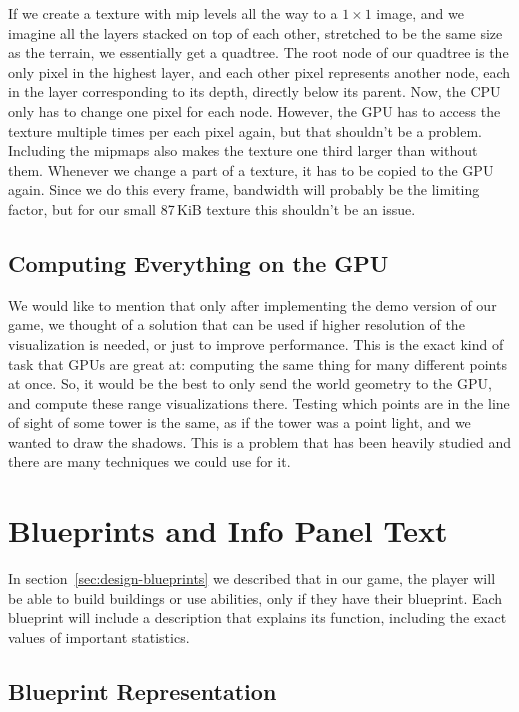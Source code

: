 If we create a texture with mip levels all the way to a $1 \times 1$ image, and we imagine all the layers stacked on top of each other, stretched to be the same size as the terrain, we essentially get a quadtree.
The root node of our quadtree is the only pixel in the highest layer, and each other pixel represents another node, each in the layer corresponding to its depth, directly below its parent.
Now, the CPU only has to change one pixel for each node.
However, the GPU has to access the texture multiple times per each pixel again, but that shouldn't be a problem.
Including the mipmaps also makes the texture one third larger than without them.
Whenever we change a part of a texture, it has to be copied to the GPU again.
Since we do this every frame, bandwidth will probably be the limiting factor, but for our small 87\,KiB texture this shouldn't be an issue.

\subsection{Computing Everything on the GPU}

We would like to mention that only after implementing the demo version of our game, we thought of a solution that can be used if higher resolution of the visualization is needed, or just to improve performance.
This is the exact kind of task that GPUs are great at: computing the same thing for many different points at once.
So, it would be the best to only send the world geometry to the GPU, and compute these range visualizations there.
Testing which points are in the line of sight of some tower is the same, as if the tower was a point light, and we wanted to draw the shadows.
This is a problem that has been heavily studied and there are many techniques we could use for it.

\section{Blueprints and Info Panel Text}

In section~\ref{sec:design-blueprints} we described that in our game, the player will be able to build buildings or use abilities, only if they have their blueprint.
Each blueprint will include a description that explains its function, including the exact values of important statistics.

\subsection{Blueprint Representation}

